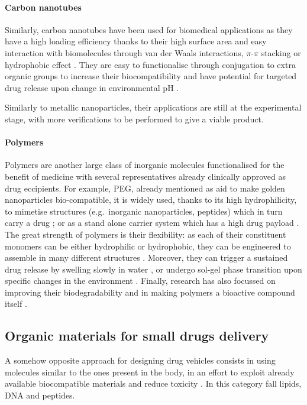 \paragraph{Carbon nanotubes}
Similarly, carbon nanotubes have been used for biomedical applications as they have a high loading efficiency thanks to their high surface area and easy interaction with biomolecules through van der Waals interactions, $\pi$-$\pi$ stacking or hydrophobic effect \cite{Erol2017}. They are easy to functionalise through conjugation to extra organic groups to increase their biocompatibility and have potential for targeted drug release upon change in environmental pH \cite{Depan2011}.

Similarly to metallic nanoparticles, their applications are still at the experimental stage, with more verifications to be performed to give a viable product.


\paragraph{Polymers} Polymers are another large class of inorganic molecules functionalised for the benefit of medicine with several representatives already clinically approved as drug eccipients. For example, PEG, already mentioned as aid to make golden nanoparticles bio-compatible, it is widely used, thanks to its high hydrophilicity, to mimetise structures (e.g.\ inorganic nanoparticles, peptides) which in turn carry a drug \cite{Lammers2009}; or as a stand alone carrier system which has a high drug payload \cite{Liechty2010}. The great strength of polymers is their flexibility: as each of their constituent monomers can be either hydrophilic or hydrophobic, they can be engineered to assemble in many different structures \cite{Kawakatsu2004}. Moreover, they can trigger a sustained drug release by swelling slowly in water \cite{Nicolas2013}, or undergo sol-gel phase transition upon specific changes in the environment \cite{Liechty2010}. Finally, research has also focussed on improving their biodegradability \cite{Nair2007} and in making polymers a bioactive compound itself \cite{Rao2018}.


\subsection{Organic materials for small drugs delivery} \label{sec:organic}

A somehow opposite approach for designing drug vehicles consists in using molecules similar to the ones present in the body, in an effort to exploit already available biocompatible materials and reduce toxicity \cite{Yoo2011}. In this category fall lipids, DNA and peptides.

